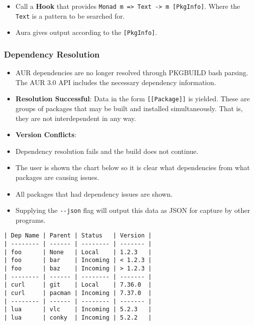 \documentclass{article}
\begin{document}
\begin{itemize}
  \begin{itemize}
  \itemsep1pt\parskip0pt
  \item
    Call a \textbf{Hook} that provides
    \texttt{Monad m =\textgreater{} Text -\textgreater{} m {[}PkgInfo{]}}.
    Where the \texttt{Text} is a pattern to be searched for.
  \item
    Aura gives output according to the \texttt{{[}PkgInfo{]}}.
  \end{itemize}
\end{itemize}

\subsubsection{Dependency Resolution}\label{dependency-resolution}

\begin{itemize}
\itemsep1pt\parskip0pt
\item
  AUR dependencies are no longer resolved through PKGBUILD bash parsing.
  The AUR 3.0 API includes the necessary dependency information.
\item
  \textbf{Resolution Successful}: Data in the form
  \texttt{{[}{[}Package{]}{]}} is yielded. These are groups of packages
  that may be built and installed simultaneously. That is, they are not
  interdependent in any way.
\item
  \textbf{Version Conflicts}:
\item
  Dependency resolution fails and the build does not continue.
\item
  The user is shown the chart below so it is clear what dependencies
  from what packages are causing issues.
\item
  All packages that had dependency issues are shown.
\item
  Supplying the \texttt{-\/-json} flag will output this data as JSON for
  capture by other programs.
\end{itemize}

\begin{verbatim}
| Dep Name | Parent | Status   | Version |
| -------- | ------ | -------- | ------- |
| foo      | None   | Local    | 1.2.3   |
| foo      | bar    | Incoming | < 1.2.3 |
| foo      | baz    | Incoming | > 1.2.3 |
| -------- | ------ | -------- | ------- |
| curl     | git    | Local    | 7.36.0  |
| curl     | pacman | Incoming | 7.37.0  |
| -------- | ------ | -------- | ------- |
| lua      | vlc    | Incoming | 5.2.3   |
| lua      | conky  | Incoming | 5.2.2   |
\end{verbatim}
\end{document}
